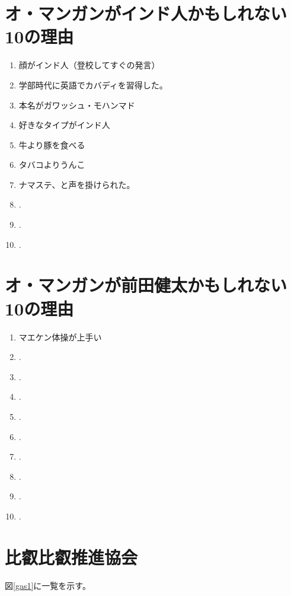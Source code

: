 \newpage
\section{オ・マンガンがインド人かもしれない10の理由}
\begin{enumerate}
\item 顔がインド人（登校してすぐの発言）
\item 学部時代に英語でカバディを習得した。
\item 本名がガワッシュ・モハンマド
\item 好きなタイプがインド人
\item 牛より豚を食べる
\item タバコよりうんこ
\item ナマステ、と声を掛けられた。
\item .
\item .
\item .
\end{enumerate}

\section{オ・マンガンが前田健太かもしれない10の理由}
\begin{enumerate}
\item マエケン体操が上手い
\item .
\item .
\item .
\item .
\item .
\item .
\item .
\item .
\item .
\end{enumerate}

\newpage
\section{比叡比叡推進協会}
図\ref{gas1}に一覧を示す。


